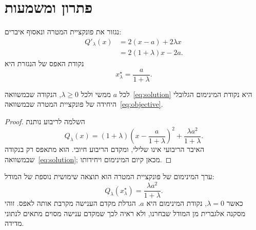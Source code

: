 \section{פתרון ומשמעות}
נגזור את פונקציית המטרה ונאסוף איברים:
\begin{align*}
Q'_\lambda(x)&=2(x-a)+2\lambda x\\
             &=2(1+\lambda)x-2a.
\end{align*}
נקודת האפס של הנגזרת היא
\begin{equation}\label{eq:solution}
x_\lambda^\star=\frac{a}{1+\lambda}.
\end{equation}
\begin{paperlemma}\label{lem:minimum}
לכל $a$ ממשי ולכל $\lambda\geq 0$, הנקודה שבמשוואה~\eqref{eq:solution}
היא נקודת המינימום הגלובלי היחידה של פונקציית המטרה
שבמשוואה~\eqref{eq:objective}.
\end{paperlemma}
\begin{proof}
השלמה לריבוע נותנת
\[
Q_\lambda(x)=(1+\lambda)
 \left(x-\frac{a}{1+\lambda}\right)^2+
 \frac{\lambda a^2}{1+\lambda}.
\]
האיבר הריבועי אינו שלילי, ומקדם הריבוע חיובי. הוא מתאפס רק בנקודה
שבמשוואה~\eqref{eq:solution}; מכאן קיום המינימום ויחידותו.
\end{proof}
ערך המינימום של פונקציית המטרה הוא תוצאה שימושית נוספת של המודל:
\begin{equation}\label{eq:minimum-value}
Q_\lambda(x_\lambda^\star)=\frac{\lambda a^2}{1+\lambda}.
\end{equation}
כאשר $\lambda=0$, נקודת המינימום היא $a$. הגדלת מקדם הענישה מקרבת אותה
לאפס. זוהי מסקנה אלגברית מן המודל שבחרנו, ולא ראיה לכך שמקדם ענישה
מסוים מתאים לנתוני מדידה.
